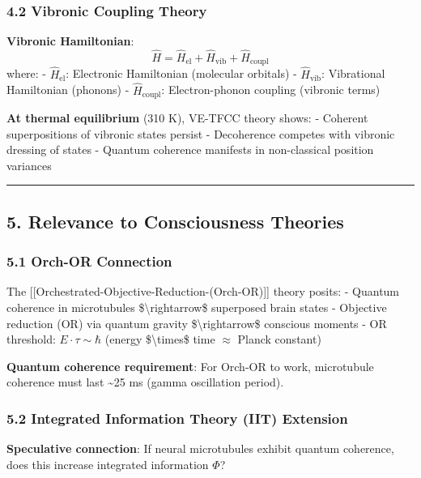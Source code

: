 \subsubsection{4.2 Vibronic Coupling
Theory}\label{vibronic-coupling-theory}

\textbf{Vibronic Hamiltonian}:
\[\hat{H} = \hat{H}_{\text{el}} + \hat{H}_{\text{vib}} + \hat{H}_{\text{coupl}}\]
where: - \(\hat{H}_{\text{el}}\): Electronic Hamiltonian (molecular
orbitals) - \(\hat{H}_{\text{vib}}\): Vibrational Hamiltonian (phonons)
- \(\hat{H}_{\text{coupl}}\): Electron-phonon coupling (vibronic terms)

\textbf{At thermal equilibrium} (310 K), VE-TFCC theory shows: -
Coherent superpositions of vibronic states persist - Decoherence
competes with vibronic dressing of states - Quantum coherence manifests
in non-classical position variances

\begin{center}\rule{0.5\linewidth}{0.5pt}\end{center}

\subsection{5. Relevance to Consciousness
Theories}\label{relevance-to-consciousness-theories}

\subsubsection{5.1 Orch-OR Connection}\label{orch-or-connection}

The {[}{[}Orchestrated-Objective-Reduction-(Orch-OR){]}{]} theory
posits: - Quantum coherence in microtubules
\$\textbackslash rightarrow\$ superposed brain states - Objective
reduction (OR) via quantum gravity \$\textbackslash rightarrow\$
conscious moments - OR threshold: \(E \cdot \tau \sim \hbar\) (energy
\$\textbackslash times\$ time \(\approx\) Planck constant)

\textbf{Quantum coherence requirement}: For Orch-OR to work, microtubule
coherence must last \textasciitilde25 ms (gamma oscillation period).

\subsubsection{5.2 Integrated Information Theory (IIT)
Extension}\label{integrated-information-theory-iit-extension}

\textbf{Speculative connection}: If neural microtubules exhibit quantum
coherence, does this increase integrated information \(\Phi\)?

